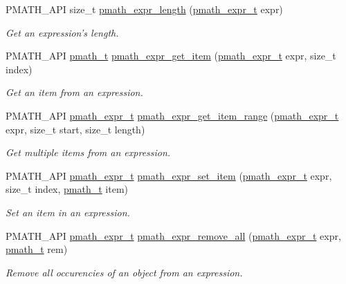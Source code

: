 \begin{CompactItemize}
PMATH\_\-API size\_\-t \hyperlink{group__expressions_gf77c0a198380cd9b3e7e1a47f41f57c0}{pmath\_\-expr\_\-length} (\hyperlink{classpmath__expr__t}{pmath\_\-expr\_\-t} expr)
\begin{CompactList}\small\item\em Get an expression's length. \item\end{CompactList}\item 
PMATH\_\-API \hyperlink{classpmath__t}{pmath\_\-t} \hyperlink{group__expressions_g70b7099d22d00d94f52df167b4e42364}{pmath\_\-expr\_\-get\_\-item} (\hyperlink{classpmath__expr__t}{pmath\_\-expr\_\-t} expr, size\_\-t index)
\begin{CompactList}\small\item\em Get an item from an expression. \item\end{CompactList}\item 
PMATH\_\-API \hyperlink{classpmath__expr__t}{pmath\_\-expr\_\-t} \hyperlink{group__expressions_ga3ba4e55b5e454f569c7e131653d5b14}{pmath\_\-expr\_\-get\_\-item\_\-range} (\hyperlink{classpmath__expr__t}{pmath\_\-expr\_\-t} expr, size\_\-t start, size\_\-t length)
\begin{CompactList}\small\item\em Get multiple items from an expression. \item\end{CompactList}\item 
PMATH\_\-API \hyperlink{classpmath__expr__t}{pmath\_\-expr\_\-t} \hyperlink{group__expressions_g2771a8ad79e108e60df5dbe3ea9c7bf8}{pmath\_\-expr\_\-set\_\-item} (\hyperlink{classpmath__expr__t}{pmath\_\-expr\_\-t} expr, size\_\-t index, \hyperlink{classpmath__t}{pmath\_\-t} item)
\begin{CompactList}\small\item\em Set an item in an expression. \item\end{CompactList}\item 
PMATH\_\-API \hyperlink{classpmath__expr__t}{pmath\_\-expr\_\-t} \hyperlink{group__expressions_g639d7a67fe8b892667b00acc2504b474}{pmath\_\-expr\_\-remove\_\-all} (\hyperlink{classpmath__expr__t}{pmath\_\-expr\_\-t} expr, \hyperlink{classpmath__t}{pmath\_\-t} rem)
\begin{CompactList}\small\item\em Remove all occurencies of an object from an expression. \item\end{CompactList}\item 

\end{CompactItemize}
